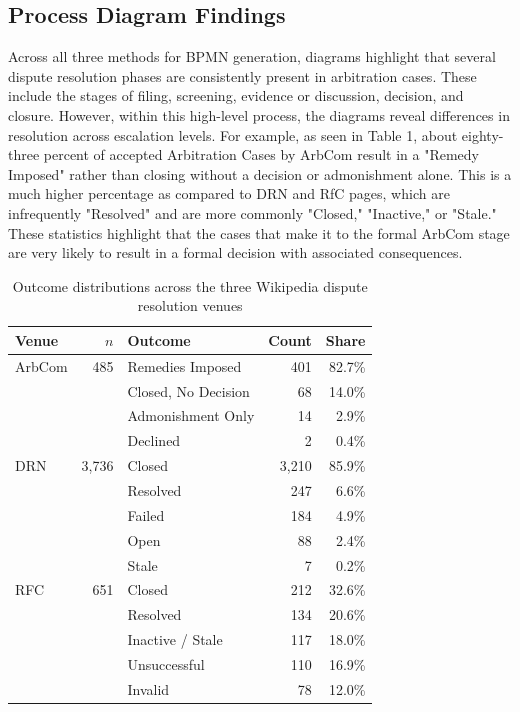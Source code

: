 \documentclass[conference]{IEEEtran}
\begin{document}
\subsection{Process Diagram Findings}
Across all three methods for BPMN generation, diagrams highlight that several dispute resolution phases are consistently present in arbitration cases. These include the stages of filing, screening, evidence or discussion, decision, and closure. However, within this high-level process, the diagrams reveal differences in resolution across escalation levels. For example, as seen in Table 1, about eighty-three percent of accepted Arbitration Cases by ArbCom result in a "Remedy Imposed" rather than closing without a decision or admonishment alone. This is a much higher percentage as compared to DRN and RfC pages, which are infrequently "Resolved" and are more commonly "Closed," "Inactive," or "Stale." These statistics highlight that the cases that make it to the formal ArbCom stage are very likely to result in a formal decision with associated consequences.

\begin{table}[t!]
\centering
\label{tab:outcomes}
\begin{tabular}{l r l r r}
\toprule
\textbf{Venue} & \textbf{$n$} & \textbf{Outcome} & \textbf{Count} & \textbf{Share} \\
\midrule
ArbCom & 485 & Remedies Imposed         & 401 & 82.7\% \\
       &     & Closed, No Decision      &  68 & 14.0\% \\
       &     & Admonishment Only        &  14 &  2.9\% \\
       &     & Declined                 &   2 &  0.4\% \\
\midrule
DRN    & 3{,}736 & Closed               & 3{,}210 & 85.9\% \\
       &     & Resolved                 & 247 &  6.6\% \\
       &     & Failed                   & 184 &  4.9\% \\
       &     & Open                     &  88 &  2.4\% \\
       &     & Stale                    &   7 &  0.2\% \\
\midrule
RFC    & 651 & Closed                   & 212 & 32.6\% \\
       &     & Resolved                 & 134 & 20.6\% \\
       &     & Inactive / Stale         & 117 & 18.0\% \\
       &     & Unsuccessful             & 110 & 16.9\% \\
       &     & Invalid                  &  78 & 12.0\% \\
\bottomrule
\end{tabular}
\caption{Outcome distributions across the three Wikipedia dispute resolution
venues}
\end{table}
\end{document}
